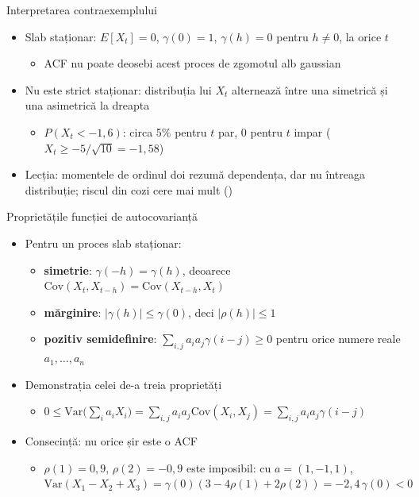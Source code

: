 \begin{frame}{Interpretarea contraexemplului}
\itemsize{\small}
\begin{itemize}
    \item Slab staționar: $E[X_t] = 0$, $\gamma(0) = 1$, $\gamma(h) = 0$ pentru $h \ne 0$, la orice $t$
    \begin{itemize}
        \item ACF nu poate deosebi acest proces de zgomotul alb gaussian
    \end{itemize}
    \item Nu este strict staționar: distribuția lui $X_t$ alternează între una simetrică și una asimetrică la dreapta
    \begin{itemize}
        \item $P(X_t < -1{,}6)$: circa 5\% pentru $t$ par, 0 pentru $t$ impar ($X_t \ge -5/\sqrt{10} = -1{,}58$)
    \end{itemize}
    \item Lecția: momentele de ordinul doi rezumă dependența, dar nu întreaga distribuție; riscul din cozi cere mai mult ()
\end{itemize}
\end{frame}

\begin{frame}{Proprietățile funcției de autocovarianță}
\itemsize{\small}
\begin{itemize}
    \item Pentru un proces slab staționar:
    \begin{itemize}
        \item \textbf{simetrie}: $\gamma(-h) = \gamma(h)$, deoarece $\mathrm{Cov}(X_t, X_{t-h}) = \mathrm{Cov}(X_{t-h}, X_t)$
        \item \textbf{mărginire}: $|\gamma(h)| \le \gamma(0)$, deci $|\rho(h)| \le 1$
        \item \textbf{pozitiv semidefinire}: $\sum_{i,j} a_i a_j \gamma(i - j) \ge 0$ pentru orice numere reale $a_1, \dots, a_n$
    \end{itemize}
    \item Demonstrația celei de-a treia proprietăți
    \begin{itemize}
        \item $0 \le \mathrm{Var}\big(\sum_i a_i X_i\big) = \sum_{i,j} a_i a_j \mathrm{Cov}(X_i, X_j) = \sum_{i,j} a_i a_j \gamma(i - j)$
    \end{itemize}
    \item Consecință: nu orice șir este o ACF
    \begin{itemize}
        \item $\rho(1) = 0{,}9$, $\rho(2) = -0{,}9$ este imposibil: cu $a = (1, -1, 1)$, $\mathrm{Var}(X_1 - X_2 + X_3) = \gamma(0)(3 - 4\rho(1) + 2\rho(2)) = -2{,}4\,\gamma(0) < 0$
    \end{itemize}
\end{itemize}
\end{frame}

